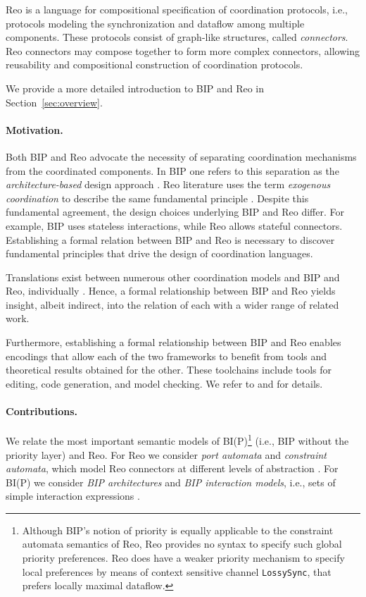 \documentclass[submission,copyright,creativecommons,hidelinks]{eptcs}
\theoremstyle{plain} \newtheorem{theorem}{Theorem}
\theoremstyle{definition}
\theoremstyle{remark}
\newcommand{\secn}[1]{Section~\ref{sec:#1}}
\begin{document}
Reo is a language for compositional specification of coordination protocols, i.e., protocols modeling the synchronization and dataflow among multiple components.
These protocols consist of graph-like structures, called {\em connectors}.
Reo connectors may compose together to form more complex connectors, allowing reusability and compositional construction of coordination protocols.

We provide a more detailed introduction to BIP and Reo in \secn{overview}.

\paragraph{Motivation.} 
Both BIP and Reo advocate the necessity of separating coordination mechanisms from the coordinated components.
In BIP one refers to this separation as the {\em architecture-based} design approach \cite{BBJS14}. 
Reo literature uses the term {\em exogenous coordination} to describe the same fundamental principle \cite{PA01, Reo, Arbab11}. 
Despite this fundamental agreement, the design choices underlying BIP and Reo differ.
For example, BIP uses stateless interactions, while Reo allows stateful connectors.
Establishing a formal relation between BIP and Reo is necessary to discover fundamental principles that drive the design of coordination languages.

Translations exist between numerous other coordination models and BIP and Reo, individually \cite{CRB+08, BMM11, PC08, TSR11}. 
Hence, a formal relationship between BIP and Reo yields insight, albeit indirect, into the relation of each with a wider range of related work.

Furthermore, establishing a formal relationship between BIP and Reo enables encodings that allow each of the two frameworks to benefit from tools and theoretical results obtained for the other. 
These toolchains include tools for editing, code generation, and model checking.
We refer to \cite{biptools} and \cite{reotools,Arbab11} for details.

\paragraph{Contributions.} 
We relate the most important semantic models of BI(P)\footnote{\label{fn:prio}Although BIP's notion of priority is equally applicable to the constraint automata semantics of Reo, Reo provides no syntax to specify such global priority preferences. Reo does have a weaker priority mechanism to specify local preferences by means of context sensitive channel {\tt LossySync}, that prefers locally maximal dataflow.} (i.e., BIP without the priority layer) and Reo. 
For Reo we consider {\em port automata} and {\em constraint automata}, which model Reo connectors at different levels of abstraction \cite{JA12}. 
For BI(P) we consider {\em BIP architectures} \cite{ABBJS14} and {\em BIP interaction models}, i.e., sets of simple interaction expressions \cite{BBJS14}. 
\end{document}
